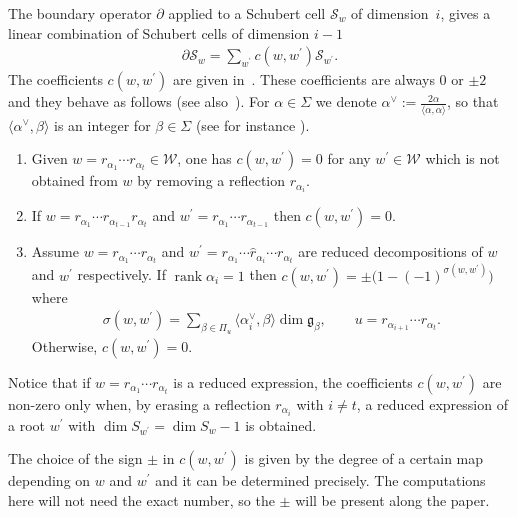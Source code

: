 \documentclass[10pt,a4paper]{amsart}
\numberwithin{equation}{section}
\begin{document}
The boundary operator $\partial $ applied to a Schubert cell $\mathcal{S}_{w} $ of dimension~$i$, gives a linear combination of Schubert cells of dimension $i-1$
\begin{gather}
\partial \mathcal{S}_{w}=\sum_{w^{\prime }}c(w,w^{\prime })\mathcal{S}_{w^{\prime }}. \label{eq.boundcoeff}
\end{gather}
The coefficients $c(w,w^{\prime })$ are given in~\cite[Section~2]{RSM}. These coefficients are always $0$ or $\pm 2$ and they behave as follows (see also~\cite{SR}). For $\alpha\in \Sigma$ we denote $\alpha ^{\vee }:=\frac{2\alpha }{ \langle \alpha,\alpha \rangle }$, so that $ \langle \alpha ^{\vee },\beta \rangle $ is an integer for $\beta \in \Sigma$ (see for instance \cite{He}).
\begin{enumerate}\itemsep=0pt
\item \label{onlysupr}Given $w=r_{\alpha _{1}}\cdots r_{\alpha _{t}}\in \mathcal{W}$, one has $c(w,w^{\prime })=0$ for any $w^{\prime }\in \mathcal{W}$ which is not obtained from $w$ by removing a reflection $r_{\alpha _{i}}$.
\item \label{suprult}If $w=r_{\alpha _{1}}\cdots r_{\alpha _{t-1}}r_{\alpha_{t}}$ and $w^{\prime }=r_{\alpha _{1}}\cdots r_{\alpha _{t-1}}$ then $c(w,w^{\prime })=0$.
\item Assume $w=r_{\alpha _{1}}\cdots r_{\alpha _{t}}$ and $w^{\prime}=r_{\alpha _{1}}\cdots \widehat{r}_{\alpha _{i}}\cdots r_{\alpha _{t}}$ are reduced decompositions of $w$ and $w^{\prime }$ respectively. If $\operatorname{rank} \alpha _{i}=1$ then $c(w,w^{\prime })=\pm \big(1-(-1) ^{\sigma ( w,w^{\prime }) }\big) $ where
\begin{gather}
\sigma (w,w^{\prime}) =\sum_{\beta \in \Pi _{u}}\langle \alpha _{i}^\vee,\beta \rangle \dim \mathfrak{g}_{\beta },\qquad u=r_{\alpha _{i+1}}\cdots r_{\alpha_{t}}. \label{forsigmasoma}
\end{gather}%
Otherwise, $c(w,w^{\prime })=0$.
\end{enumerate}

Notice that if $w=r_{\alpha_1}\cdots r_{\alpha_t}$ is a reduced expression, the coefficients $c(w,w^{\prime })$ are non-zero only when, by erasing a reflection $r_{\alpha_i}$ with $i\neq t$, a reduced expression of a root $w^{\prime }$ with $\dim S_{w^{\prime }}=\dim S_w-1$ is obtained.

The choice of the sign $\pm $ in $c(w,w^{\prime })$ is given by the degree of a certain map depending on $w$ and $w^{\prime }$ \cite[Theorem~2.6]{RSM} and it can be determined precisely. The computations here will not need the exact number, so the $\pm $ will be present along the paper.
\end{document}
